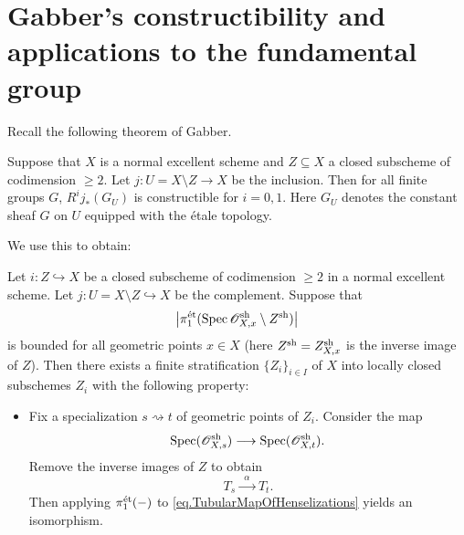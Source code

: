 \documentclass[12pt]{amsart}
\numberwithin{equation}{theorem}
\renewcommand{\:}{\colon}
\newcommand{\piet}{\pi_1^{\textnormal{\'{e}t}}} %
\theoremstyle{theorem}
\renewcommand{\O}{\mathscr O}
\begin{document}
\section{Gabber's constructibility and applications to the fundamental group}

Recall the following theorem of Gabber.

\begin{theorem}\textnormal{\cite[Expos\'e XXI, Th\'eor\`eme 1.1, 1.3]{TravauxdeGabber}}
\label{thm.GabberConstructibility}
Suppose that $X$ is a normal excellent scheme and $Z \subseteq X$ a closed subscheme of codimension $\geq 2$.
Let $j\colon U = X \setminus Z \to X$ be the inclusion.
Then for all finite groups $G$, $R^i j_* (G_U)$ is constructible for $i = 0, 1$.
Here $G_U$ denotes the constant sheaf $G$ on $U$ equipped with the \'etale topology.
\end{theorem}

We use this to obtain:

\begin{proposition} \label{prop.GabberStratification}
Let $i\colon Z \hookrightarrow X$ be a closed subscheme of codimension $\ge 2$ in a normal excellent scheme.
Let $j\colon U = X \setminus Z \hookrightarrow X$ be the complement.
Suppose that
\[ \big| \pi_1^{\et}(\Spec \O_{X,x}^{\sh} \setminus {Z}^{\sh}) \big| \]
is bounded for all geometric points $x \in X$ (here $Z^{\textnormal{sh}} = Z_{X,x}^{\textnormal{sh}}$ is the inverse image of $Z$).
Then there exists a finite stratification $\{ Z_i \}_{i \in I}$ of $X$ into locally closed subschemes $Z_i$ with the following property:
\begin{itemize}
\item[] Fix a specialization $s \rightsquigarrow t$ of geometric points of $Z_i$. %
Consider the map
    \begin{equation}
    \label{eq.MapOfHenselizations}
     \Spec(\O^{\sh}_{X,s}) \longrightarrow \Spec(\O^{\sh}_{X,t}).
    \end{equation}
    Remove the inverse images of $Z$ to obtain
    \begin{equation}
    \label{eq.TubularMapOfHenselizations}
    T_s \xrightarrow{\;\;\alpha\;\;} T_t.
    \end{equation}
    Then applying $\piet(-)$ to \autoref{eq.TubularMapOfHenselizations} yields an isomorphism.
\end{itemize}
\end{proposition}
\end{document}
